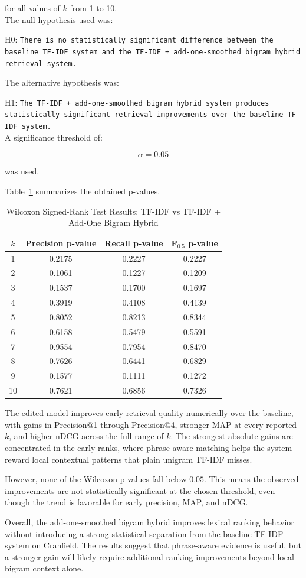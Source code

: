 for all values of $k$ from 1 to 10.\\

The null hypothesis used was:

H0: \texttt{There is no statistically significant difference between the baseline TF-IDF system and the TF-IDF + add-one-smoothed bigram hybrid retrieval system.}

The alternative hypothesis was:

H1: \texttt{The TF-IDF + add-one-smoothed bigram hybrid system produces statistically significant retrieval improvements over the baseline TF-IDF system.}\\

A significance threshold of:

\[
\alpha = 0.05
\]

was used.

Table~\ref{tab:wilcoxon_bigram_results} summarizes the obtained p-values.

\begin{table}[H]
\centering
\caption{Wilcoxon Signed-Rank Test Results: TF-IDF vs TF-IDF + Add-One Bigram Hybrid}
\label{tab:wilcoxon_bigram_results}
\begin{tabular}{|c|c|c|c|}
\hline
$k$ & Precision p-value & Recall p-value & F$_{0.5}$ p-value \\
\hline
1  & 0.2175 & 0.2227 & 0.2227 \\
2  & 0.1061 & 0.1227 & 0.1209 \\
3  & 0.1537 & 0.1700 & 0.1697 \\
4  & 0.3919 & 0.4108 & 0.4139 \\
5  & 0.8052 & 0.8213 & 0.8344 \\
6  & 0.6158 & 0.5479 & 0.5591 \\
7  & 0.9554 & 0.7954 & 0.8470 \\
8  & 0.7626 & 0.6441 & 0.6829 \\
9  & 0.1577 & 0.1111 & 0.1272 \\
10 & 0.7621 & 0.6856 & 0.7326 \\
\hline
\end{tabular}
\end{table}

The edited model improves early retrieval quality numerically over the baseline, with gains in Precision@1 through Precision@4, stronger MAP at every reported $k$, and higher nDCG across the full range of $k$.
The strongest absolute gains are concentrated in the early ranks, where phrase-aware matching helps the system reward local contextual patterns that plain unigram TF-IDF misses.

However, none of the Wilcoxon p-values fall below $0.05$.
This means the observed improvements are not statistically significant at the chosen threshold, even though the trend is favorable for early precision, MAP, and nDCG.

Overall, the add-one-smoothed bigram hybrid improves lexical ranking behavior without introducing a strong statistical separation from the baseline TF-IDF system on Cranfield.
The results suggest that phrase-aware evidence is useful, but a stronger gain will likely require additional ranking improvements beyond local bigram context alone.